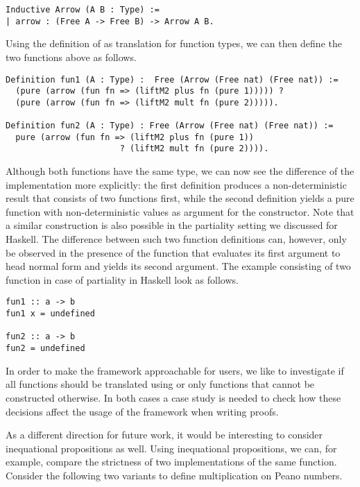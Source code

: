 \begin{verbatim}
Inductive Arrow (A B : Type) :=
| arrow : (Free A -> Free B) -> Arrow A B.
\end{verbatim}

Using the definition of  as translation for function types, we can then define the two functions above as follows.

\begin{verbatim}
Definition fun1 (A : Type) :  Free (Arrow (Free nat) (Free nat)) :=
  (pure (arrow (fun fn => (liftM2 plus fn (pure 1))))) ?
  (pure (arrow (fun fn => (liftM2 mult fn (pure 2))))).

Definition fun2 (A : Type) : Free (Arrow (Free nat) (Free nat)) :=
  pure (arrow (fun fn => (liftM2 plus fn (pure 1))
                       ? (liftM2 mult fn (pure 2)))).
\end{verbatim}

Although both functions have the same type, we can now see the difference of the implementation more explicitly: the first definition produces a non-deterministic result that consists of two functions first, while the second definition yields a pure function with non-deterministic values as argument for the  constructor.
Note that a similar construction is also possible in the partiality setting we discussed for Haskell.
The difference between such two function definitions can, however, only be observed in the presence of the function  that evaluates its first argument to head normal form and yields its second argument.
The example consisting of two function in case of partiality in Haskell look as follows.

\begin{verbatim}
fun1 :: a -> b
fun1 x = undefined

fun2 :: a -> b
fun2 = undefined
\end{verbatim}

In order to make the framework approachable for users, we like to investigate if all functions should be translated using  or only functions that cannot be constructed otherwise.
In both cases a case study is needed to check how these decisions affect the usage of the framework when writing proofs.

As a different direction for future work, it would be interesting to consider inequational propositions as well.
Using inequational propositions, we can, for example, compare the strictness of two implementations of the same function.
Consider the following two variants to define multiplication on Peano numbers.

